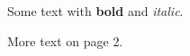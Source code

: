 \documentclass{article}
\begin{document}
Some text with \textbf{bold} and \textit{italic}.

\newpage

More text on page 2.
\end{document}

